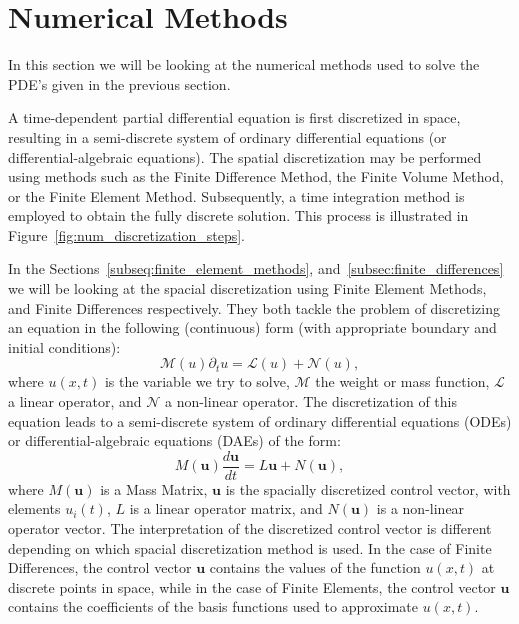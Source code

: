 \section{Numerical Methods}\label{sec:numerical_methods}

In this section we will be looking at the numerical methods used to solve the PDE's given in the previous section. 

A time-dependent partial differential equation is first discretized in space, resulting in a semi-discrete system of ordinary differential equations (or differential-algebraic equations). The spatial discretization may be performed using methods such as the Finite Difference Method, the Finite Volume Method, or the Finite Element Method. Subsequently, a time integration method is employed to obtain the fully discrete solution. This process is illustrated in Figure~\ref{fig:num_discretization_steps}. 

In the Sections~\ref{subseq:finite_element_methods}, and~\ref{subsec:finite_differences} we will be looking at the spacial discretization using Finite Element Methods, and Finite Differences respectively. They both tackle the problem of discretizing an equation in the following (continuous) form (with appropriate boundary and initial conditions):
\begin{equation}\label{eq:general_pde_numerical_methods}
    \mathcal{M}(u)\partial_t u = \mathcal{L}(u)+\mathcal{N}(u),
\end{equation}
where $u(x,t)$ is the variable we try to solve, $\mathcal{M}$ the weight or mass function, $\mathcal{L}$ a linear operator, and $\mathcal{N}$ a non-linear operator. The discretization of this equation leads to a semi-discrete system of ordinary differential equations (ODEs) or differential-algebraic equations (DAEs) of the form:
\begin{equation}\label{eq:semi_discrete_numerical_methods}
    M(\mathbf{u}) \frac{d\mathbf{u}}{dt} = L\mathbf{u}+N(\mathbf{u}),
\end{equation}
where $M(\mathbf{u})$ is a Mass Matrix, $\mathbf{u}$ is the spacially discretized control vector, with elements $u_i(t)$, $L$ is a linear operator matrix, and $N(\mathbf{u})$ is a non-linear operator vector. The interpretation of the discretized control vector is different depending on which spacial discretization method is used. In the case of Finite Differences, the control vector $\mathbf{u}$ contains the values of the function $u(x,t)$ at discrete points in space, while in the case of Finite Elements, the control vector $\mathbf{u}$ contains the coefficients of the basis functions used to approximate $u(x,t)$.

